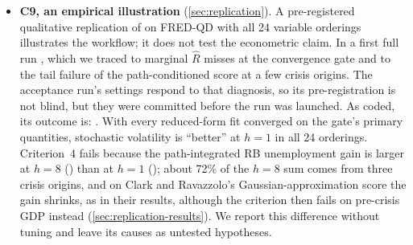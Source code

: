\begin{itemize}
\item \textbf{C9, an empirical illustration} (\cref{sec:replication}).
  A pre-registered qualitative replication of \citet{clark2015macroeconomic} on FRED-QD with all 24 variable orderings illustrates the workflow; it does not test the econometric claim.
  In a first full run , which we traced to marginal $\hat R$ misses at the convergence gate and to the tail failure of the path-conditioned score at a few crisis origins. %
  The acceptance run's settings respond to that diagnosis, so its pre-registration is not blind, but they were committed before the run was launched. %
  As coded, its outcome is: . With every reduced-form fit converged on the gate's primary quantities, stochastic volatility is ``better'' at $h = 1$ in all 24 orderings. Criterion~4 fails because the path-integrated RB unemployment gain is larger at $h = 8$ () than at $h = 1$ (); about 72\% of the $h = 8$ sum comes from three crisis origins, and on Clark and Ravazzolo's Gaussian-approximation score the gain shrinks, as in their results, although the criterion then fails on pre-crisis GDP instead (\cref{sec:replication-results}). We report this difference without tuning and leave its causes as untested hypotheses. %
\end{itemize}
